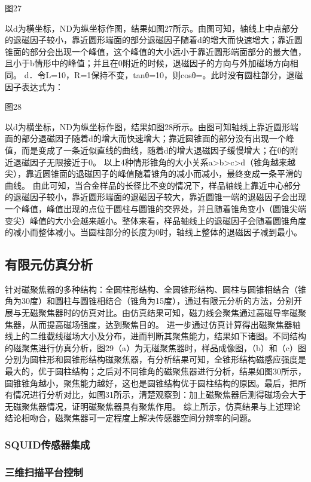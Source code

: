 \documentclass[a4paper,12pt，twoside]{ctexart}
\begin{document}
	图27\par 
	以d为横坐标，ND为纵坐标作图，结果如图27所示。由图可知，轴线上中点部分的退磁因子较小，靠近圆形端面的部分退磁因子随着d的增大而快速增大；靠近圆锥面的部分会出现一个峰值，这个峰值的大小远小于靠近圆形端面部分的最大值，且小于b情形中的峰值；并且在0附近的时候，退磁因子的方向与外加磁场方向相同。
	d．令L=10，R=1保持不变，tanθ=10，则cosθ=。此时没有圆柱部分，退磁因子表达式为：
	
	图28\par 
	以d为横坐标，ND为纵坐标作图，结果如图28所示。由图可知轴线上靠近圆形端面的部分退磁因子随着d的增大而快速增大；靠近圆锥面的部分没有出现一个峰值，而是变成了一条近似直线的曲线，随着d的增大退磁因子缓慢增大；在0的附近退磁因子无限接近于0。
	以上4种情形锥角的大小关系a>b>c>d（锥角越来越尖），靠近圆锥面的退磁因子的峰值随着锥角的减小而减小，最终变成一条平滑的曲线。
	由此可知，当合金样品的长径比不变的情况下，样品轴线上靠近中心部分的退磁因子较小，靠近圆形端面的退磁因子较大，靠近圆锥一端的退磁因子会出现一个峰值，峰值出现的点位于圆柱与圆锥的交界处，并且随着锥角变小（圆锥尖端变尖）峰值的大小会越来越小。整体来看，样品轴线上的退磁因子会随着圆锥角度的减小而整体减小。当圆柱部分的长度为0时，轴线上整体的退磁因子减到最小。
	\subsection{有限元仿真分析}
	针对磁聚焦器的多种结构：全圆柱形结构、全圆锥形结构、圆柱与圆锥相结合（锥角为30度）和圆柱与圆锥相结合（锥角为15度），通过有限元分析的方法，分别开展与无磁聚焦器时的仿真对比。由仿真结果可知，磁力线会聚焦通过高磁导率磁聚焦器，从而提高磁场强度，达到聚焦目的。
	进一步通过仿真计算得出磁聚焦器轴线上的二维截线磁场大小及分布，进而判断其聚焦能力，结果如下诸图。不同结构的磁聚焦进行仿真分析，图29（a）为无磁聚焦器时，样品成像图，（b）和（c）图分别为圆柱形和圆锥形结构磁聚焦器，有分析结果可知，全锥形结构磁感应强度是最大的，优于圆柱结构；之后对不同锥角的磁聚焦器进行分析，结果如图30所示，圆锥锥角越小，聚焦能力越好，这也是圆锥结构优于圆柱结构的原因。最后，把所有情况进行分析对比，如图31所示，清楚观察到：加上磁聚焦器后测得磁场会大于无磁聚焦器情况，证明磁聚焦器具有聚焦作用。
	综上所示，仿真结果与上述理论结论相吻合，磁聚焦器可一定程度上解决传感器空间分辨率的问题。
	
	
	
	
	
	\subsubsection{SQUID传感器集成}
	\subsubsection{三维扫描平台控制}
\end{document}

